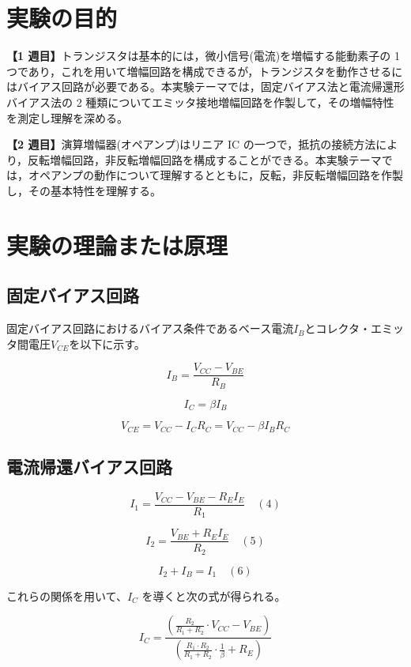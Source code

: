 \documentclass[a4paper,11pt,xelatex,ja=standard]{bxjsarticle}
\begin{document}
\section{実験の目的}
    \textbf{【1 週目】}トランジスタは基本的には，微小信号(電流)を増幅する能動素子の 1 つであり，これを用いて増幅回路を構成できるが，トランジスタを動作させるにはバイアス回路が必要である。本実験テーマでは，固定バイアス法と電流帰還形バイアス法の 2 種類についてエミッタ接地増幅回路を作製して，その増幅特性を測定し理解を深める。

    \textbf{【2 週目】}演算増幅器(オペアンプ)はリニア IC の一つで，抵抗の接続方法により，反転増幅回路，非反転増幅回路を構成することができる。本実験テーマでは，オペアンプの動作について理解するとともに，反転，非反転増幅回路を作製し，その基本特性を理解する。

\section{実験の理論または原理}
    \subsection{固定バイアス回路}
        固定バイアス回路におけるバイアス条件であるベース電流$I_B$とコレクタ・エミッタ間電圧$V_{CE}$を以下に示す。

        $$
        I_B = \frac{V_{CC} - V_{BE}}{R_B}
        $$

        $$
        I_C = \beta I_B
        $$

        $$
        V_{CE} = V_{CC} - I_C R_C = V_{CC} - \beta I_B R_C
        $$

    \subsection{電流帰還バイアス回路}

        $$
            I_1 = \frac{V_{CC} - V_{BE} - R_E I_E}{R_1} \quad (4)
        $$

        $$
            I_2 = \frac{V_{BE} + R_E I_E}{R_2} \quad (5)
        $$
        
        $$
            I_2 + I_B = I_1 \quad (6)
        $$

        これらの関係を用いて、$I_C$ を導くと次の式が得られる。

        $$
            I_C = \frac{\left(\frac{R_2}{R_1+R_2} \cdot V_{CC} - V_{BE}\right)}{{\left(\frac{{R_1 \cdot R_2}}{{R_1+R_2}} \cdot \frac{1}{\beta} + R_E\right)}}
        $$
\end{document}
